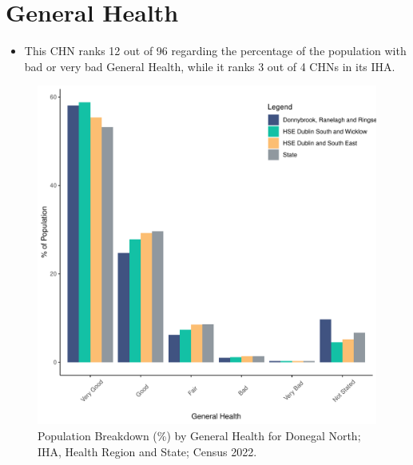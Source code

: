 \documentclass{article}
\begin{document}
\pagebreak

\section{General Health}\label{sect:GenHealth}
\begin{itemize}
\item  This CHN ranks  12 out of 96 regarding the percentage of the population with bad or very bad General Health, while it ranks   3 out of 4 CHNs in its IHA.
\end{itemize}
\begin{figure}[h]
	\centering
	\includegraphics[width = 150mm]{../figures/GenED.pdf}
	\caption{Population Breakdown (\%) by General Health for Donegal North; IHA, Health Region and State;  Census 2022.}
	\label{fig:2ae19629-1a6a-13a3-e055-000000000001}
	\end{figure}
\end{document}
